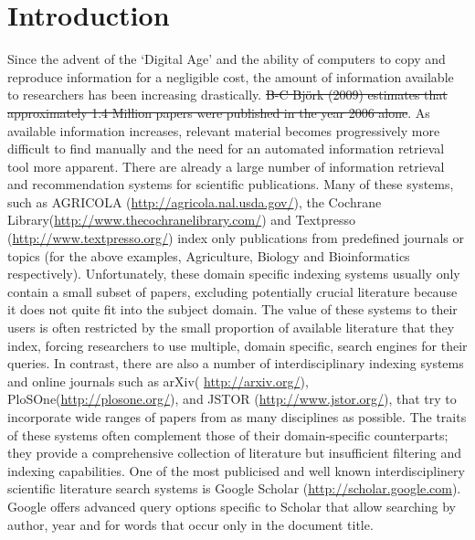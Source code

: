 \documentclass{svmult}
\begin{document}
\section{Introduction} \label{sec:1} Since the advent of the `Digital Age' and
the ability of computers to copy and reproduce information for a negligible
cost, the amount of information available to researchers has been increasing
drastically. \st{ B-C Bj\"{o}rk (2009) estimates that approximately 1.4 Million
papers were published in the year 2006 alone\cite{bjork2009}}. As available
information increases, relevant material becomes progressively more difficult
to find manually and the need for an automated information retrieval tool more
apparent.  There are already a large number of information retrieval and
recommendation systems for scientific publications.  Many of these systems,
such as AGRICOLA (\url{http://agricola.nal.usda.gov/}), the Cochrane
Library(\url{http://www.thecochranelibrary.com/}) and Textpresso
(\url{http://www.textpresso.org/}) index only publications from predefined
journals or topics (for the above examples, Agriculture, Biology and
Bioinformatics respectively).  Unfortunately, these domain specific indexing
systems usually only contain a small subset of papers, excluding potentially
crucial literature because it does not quite fit into the subject domain. 
The value of these systems to their users is often restricted by the small
proportion of available literature that they index, forcing researchers to use
multiple, domain specific, search engines for their queries.  In contrast,
there are also a number of interdisciplinary indexing systems and online
journals such as arXiv( \url{http://arxiv.org/}),
PloSOne(\url{http://plosone.org/}), and JSTOR (\url{http://www.jstor.org/}),
that try to incorporate wide ranges of papers from as many disciplines as
possible. The traits of these systems often complement those of their
domain-specific counterparts; they provide a comprehensive collection of
literature but insufficient filtering and indexing capabilities.  One of the
most publicised and well known interdisciplinery scientific literature search
systems is Google Scholar (\url{http://scholar.google.com}). Google offers
advanced query options specific to Scholar that allow searching by author, year
and for words that occur only in the document title.
\end{document}
